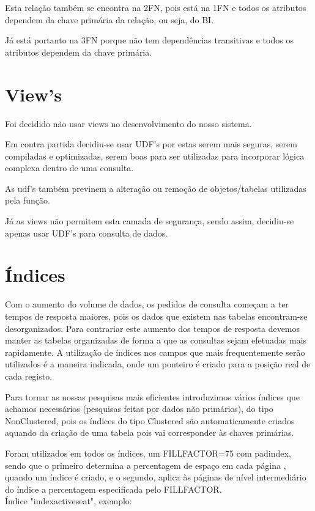 \documentclass[pdftex,12pt,a4paper]{report}
\begin{document}
Esta relação também se encontra na 2FN, pois está na 1FN e todos os atributos dependem da chave primária da relação, ou seja, do BI.

Já está portanto na 3FN porque não tem dependências transitivas e todos os atributos dependem da chave primária.

\section{View's}
Foi decidido não usar views no desenvolvimento do nosso sistema. 

Em contra partida decidiu-se usar UDF's por estas serem mais seguras, serem compiladas e optimizadas, serem boas para ser utilizadas para incorporar lógica complexa dentro de uma consulta. 

As udf's também previnem a alteração ou remoção de objetos/tabelas utilizadas pela função.

Já as views não permitem esta camada de segurança, sendo assim, decidiu-se apenas usar UDF's para consulta de dados.

\newpage
\section{Índices}
Com o aumento do volume de dados, os pedidos de consulta começam a ter tempos de resposta maiores, pois os dados que existem nas tabelas encontram-se desorganizados. Para contrariar este aumento dos tempos de resposta devemos manter as tabelas organizadas de forma a que as consultas sejam efetuadas mais rapidamente. A utilização de índices nos campos que mais frequentemente serão utilizados é a maneira indicada, onde um ponteiro é criado para a posição real de cada registo.


Para tornar as nossas pesquisas mais eficientes introduzimos vários índices que achamos necessários (pesquisas feitas por dados não primários), do tipo NonClustered, pois os índices do tipo Clustered são automaticamente criados aquando da criação de uma tabela pois vai corresponder às chaves primárias.


Foram utilizados em todos os índices, um FILLFACTOR=75 com pad{\textunderscore}index, sendo que o primeiro determina a percentagem de espaço em cada página , quando um índice é criado, e o segundo, aplica às páginas de nível intermediário do índice a percentagem especificada pelo FILLFACTOR.
\\

Índice "indexactiveseat", exemplo:
\\
\end{document}
